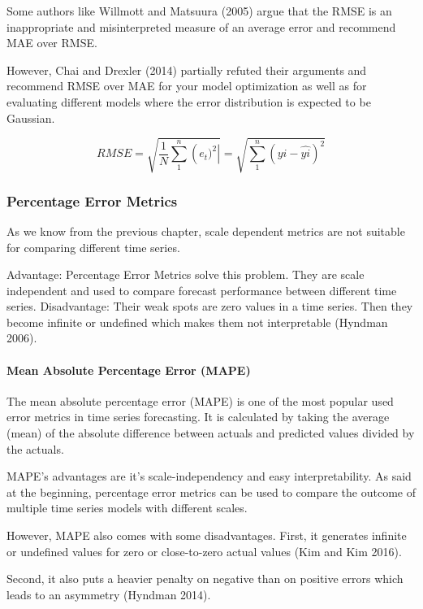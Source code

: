 \documentclass[
]{article}
\begin{document}
Some authors like Willmott and Matsuura (2005) argue that the RMSE is an
inappropriate and misinterpreted measure of an average error and
recommend MAE over RMSE.

However, Chai and Drexler (2014) partially refuted their arguments and
recommend RMSE over MAE for your model optimization as well as for
evaluating different models where the error distribution is expected to
be Gaussian.

\[ RMSE = {\sqrt{\frac{1}{N}\sum_{1}^{n}\left (e_{t})^2  \right|}} =\sqrt{\sum_{1}^{n}\left (yi-\hat{yi} \right)^2}\]

\hypertarget{percentage-error-metrics}{%
\subsubsection{Percentage Error
Metrics}\label{percentage-error-metrics}}

As we know from the previous chapter, scale dependent metrics are not
suitable for comparing different time series.

Advantage: Percentage Error Metrics solve this problem. They are scale
independent and used to compare forecast performance between different
time series. Disadvantage: Their weak spots are zero values in a time
series. Then they become infinite or undefined which makes them not
interpretable (Hyndman 2006).

\hypertarget{mean-absolute-percentage-error-mape}{%
\paragraph{Mean Absolute Percentage Error
(MAPE)}\label{mean-absolute-percentage-error-mape}}

The mean absolute percentage error (MAPE) is one of the most popular
used error metrics in time series forecasting. It is calculated by
taking the average (mean) of the absolute difference between actuals and
predicted values divided by the actuals.

MAPE's advantages are it's scale-independency and easy interpretability.
As said at the beginning, percentage error metrics can be used to
compare the outcome of multiple time series models with different
scales.

However, MAPE also comes with some disadvantages. First, it generates
infinite or undefined values for zero or close-to-zero actual values
(Kim and Kim 2016).

Second, it also puts a heavier penalty on negative than on positive
errors which leads to an asymmetry (Hyndman 2014).
\end{document}
